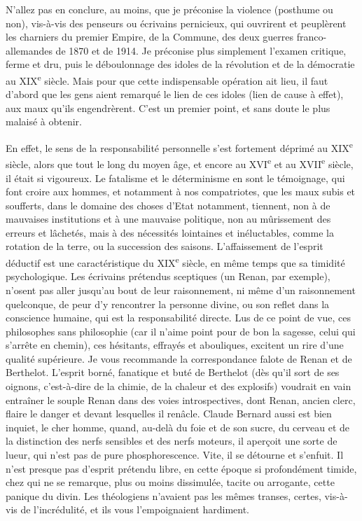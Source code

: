 \documentclass[french,twoside]{book} %
\begin{document}
N’allez pas en conclure, au moins, que je préconise la violence (posthume ou non), vis-à-vis des penseurs ou écrivains pernicieux, qui ouvrirent et peuplèrent les charniers du premier Empire, de la Commune, des deux guerres franco-allemandes de 1870 et de 1914. Je préconise plus simplement l’examen critique, ferme et dru, puis le déboulonnage des idoles de la révolution et de la démocratie au XIX\textsuperscript{e} siècle. Mais pour que cette indispensable opération ait lieu, il faut d’abord que les gens aient remarqué le lien de ces idoles (lien de cause à effet), aux maux qu’ils engendrèrent. C’est un premier point, et sans doute le plus malaisé à obtenir.\par
En effet, le sens de la responsabilité personnelle s’est fortement déprimé au XIX\textsuperscript{e} siècle, alors que tout le long du moyen âge, et encore au XVI\textsuperscript{e} et au XVII\textsuperscript{e} siècle, il était si vigoureux. Le fatalisme et le déterminisme en sont le témoignage, qui font croire aux hommes, et notamment à nos compatriotes, que les maux subis et soufferts, dans le domaine des choses d’Etat notamment, tiennent, non à de mauvaises institutions et à une mauvaise politique, non au mûrissement des erreurs et lâchetés, mais à des nécessités lointaines et inéluctables, comme la rotation de la terre, ou la succession des saisons. L’affaissement de l’esprit déductif est une caractéristique du XIX\textsuperscript{e} siècle, en même temps que sa timidité psychologique. Les écrivains prétendus sceptiques (un Renan, par exemple), n’osent pas aller jusqu’au bout de leur raisonnement, ni même d’un raisonnement quelconque, de peur d’y rencontrer la personne divine, ou son reflet dans la conscience humaine, qui est la responsabilité directe. Lus de ce point de vue, ces philosophes sans philosophie (car il n’aime point pour de bon la sagesse, celui qui s’arrête en chemin), ces hésitants, effrayés et abouliques, excitent un rire d’une qualité supérieure. Je vous recommande la correspondance falote de Renan et de Berthelot. L’esprit borné, fanatique et buté de Berthelot (dès qu’il sort de ses oignons, c’est-à-dire de la chimie, de la chaleur et des explosifs) voudrait en vain entraîner le souple Renan dans des voies introspectives, dont Renan, ancien clerc, flaire le danger et devant lesquelles il renâcle. Claude Bernard aussi est bien inquiet, le cher homme, quand, au-delà du foie et de son sucre, du cerveau et de la distinction des nerfs sensibles et des nerfs moteurs, il aperçoit une sorte de lueur, qui n’est pas de pure phosphorescence. Vite, il se détourne et s’enfuit. Il n’est presque pas d’esprit prétendu libre, en cette époque si profondément timide, chez qui ne se remarque, plus ou moins dissimulée, tacite ou arrogante, cette panique du divin. Les théologiens n’avaient pas les mêmes transes, certes, vis-à-vis de l’incrédulité, et ils vous l’empoignaient hardiment.\par
\end{document}
